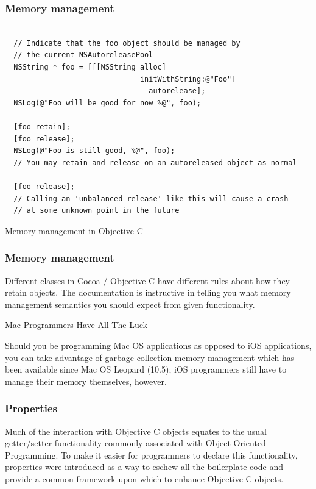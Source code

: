 \documentclass[10pt]{beamer}
\begin{document}
\begin{frame}[fragile]
  \frametitle{Memory management}
  \begin{listing}[H]
    \begin{verbatim}

  // Indicate that the foo object should be managed by
  // the current NSAutoreleasePool
  NSString * foo = [[[NSString alloc]
                               initWithString:@"Foo"]
                                 autorelease];
  NSLog(@"Foo will be good for now %@", foo);

  [foo retain]; 
  [foo release];
  NSLog(@"Foo is still good, %@", foo);
  // You may retain and release on an autoreleased object as normal

  [foo release];
  // Calling an 'unbalanced release' like this will cause a crash
  // at some unknown point in the future

  \end{verbatim}
    \caption{Memory management in Objective C}
    \label{listing:10}
  \end{listing}

\end{frame}

\begin{frame}[fragile]
  \frametitle{Memory management}
  Different classes in Cocoa / Objective C have different rules about how they retain objects.  The documentation is instructive in telling you what memory management semantics you should expect from given functionality.
\begin{block}{Mac Programmers Have All The Luck}

  Should you be programming Mac OS applications as opposed to iOS applications,
  you can take advantage of garbage collection memory management which has been
  available since Mac OS Leopard (10.5); iOS programmers still have to manage their
  memory themselves, however.

  \end{block}

\end{frame}

    
\begin{frame}[fragile]
  \frametitle{Properties}
  Much of the interaction with Objective C objects equates to the usual getter/setter functionality commonly associated with Object Oriented Programming. To make it easier for programmers to declare this functionality, properties were introduced as a way to eschew all the boilerplate code and provide a common framework upon which to enhance Objective C objects.

\end{frame}
\end{document}

